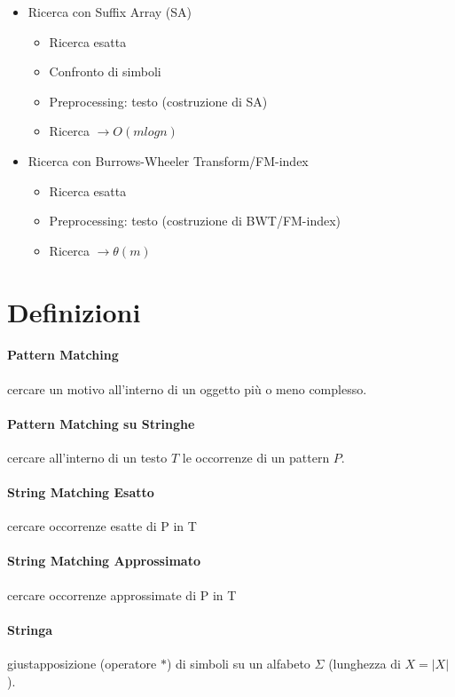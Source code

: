 \begin{itemize}
    \item Ricerca con Suffix Array (SA)
    \begin{itemize}
        \item Ricerca esatta
        \item Confronto di simboli
        \item Preprocessing: testo (costruzione di SA)
        \item Ricerca $\rightarrow O(m log n)$
    \end{itemize}

    \item Ricerca con Burrows-Wheeler Transform/FM-index
    \begin{itemize}
        \item Ricerca esatta
        \item Preprocessing: testo (costruzione di BWT/FM-index)
        \item Ricerca $\rightarrow \theta(m)$
    \end{itemize}
\end{itemize}

\section{Definizioni}

\paragraph{Pattern Matching} cercare un motivo all'interno di un oggetto pi\`u o meno complesso.
\paragraph{Pattern Matching su Stringhe} cercare all'interno di un testo $T$ le occorrenze di un pattern $P$.
\paragraph{String Matching \textbf{Esatto}} cercare occorrenze esatte di P in T
\paragraph{String Matching \textbf{Approssimato}} cercare occorrenze approssimate di P in T

\paragraph{Stringa} giustapposizione (operatore $\ast$) di simboli su un alfabeto $\Sigma$ (lunghezza di $X = |X|$).

